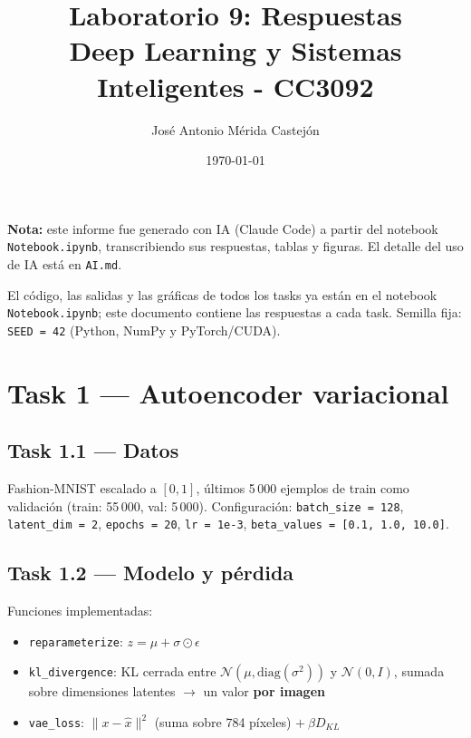 \documentclass[11pt]{article}
\title{\textbf{Laboratorio 9: Respuestas} \vspace{1em}\\
  Deep Learning y Sistemas Inteligentes - CC3092}
\author{José Antonio Mérida Castejón}
\date{\today}
\begin{document}
\decimalpoint

\maketitle

\begin{tcolorbox}[colback=gray!8, colframe=gray!50, boxrule=0.5pt]
\textbf{Nota:} este informe fue generado con IA (Claude Code) a partir del notebook \texttt{Notebook.ipynb}, transcribiendo sus respuestas, tablas y figuras. El detalle del uso de IA está en \texttt{AI.md}.
\end{tcolorbox}

El código, las salidas y las gráficas de todos los tasks ya están en el notebook \texttt{Notebook.ipynb}; este documento contiene las respuestas a cada task. Semilla fija: \texttt{SEED = 42} (Python, NumPy y PyTorch/CUDA).

\section*{Task 1 --- Autoencoder variacional}

\subsection*{Task 1.1 --- Datos}
Fashion-MNIST escalado a $[0,1]$, últimos 5\,000 ejemplos de train como validación (train: 55\,000, val: 5\,000). Configuración: \texttt{batch\_size = 128}, \texttt{latent\_dim = 2}, \texttt{epochs = 20}, \texttt{lr = 1e-3}, \texttt{beta\_values = [0.1, 1.0, 10.0]}.

\subsection*{Task 1.2 --- Modelo y pérdida}
Funciones implementadas:
\begin{itemize}
  \item \texttt{reparameterize}: $z=\mu+\sigma\odot\epsilon$
  \item \texttt{kl\_divergence}: KL cerrada entre $\mathcal N(\mu,\mathrm{diag}(\sigma^2))$ y $\mathcal N(0,I)$, sumada sobre dimensiones latentes $\rightarrow$ un valor \textbf{por imagen}
  \item \texttt{vae\_loss}: $\|x-\hat x\|^2$ (suma sobre 784 píxeles) $+\ \beta D_{KL}$
\end{itemize}
\end{document}
